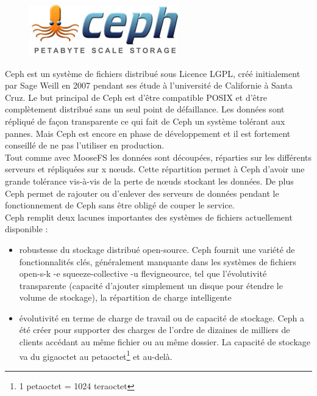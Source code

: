 \documentclass[12pt]{report}
\begin{document}
                        \begin{figure}[H]
				\begin{center}
					\includegraphics[width=0.40\linewidth]{images/cephfs.jpg}
				\end{center}
			\end{figure}

                        Ceph est un système de fichiers distribué sous Licence LGPL, créé initialement par Sage Weill en 2007 pendant ses étude à l'université de Californie à Santa Cruz. Le but principal de Ceph est d'être compatible POSIX et d'être complètement distribué sans un seul point de défaillance. Les données sont répliqué de façon transparente ce qui fait de Ceph un système tolérant aux pannes. Mais Ceph est encore en phase de développement et il est fortement conseillé de ne pas l'utiliser en production.\\

                        Tout comme avec MooseFS les données sont découpées, réparties sur les différents serveurs et répliquées sur x nœuds. Cette répartition permet à Ceph d'avoir une grande tolérance vis-à-vis de la perte de nœuds stockant les données. De plus Ceph permet de rajouter ou d'enlever des serveurs de données pendant le fonctionnement de Ceph sans être obligé de couper le service.\\

                        Ceph remplit deux lacunes importantes des systèmes de fichiers actuellement disponible :
                        \begin{itemize}
                          \item robustesse du stockage distribué open-source. Ceph fournit une variété de fonctionnalités clés, généralement manquante dans les systèmes de fichiers open-s-k -e squeeze-collective -u flevigneource, tel que l'évolutivité transparente (capacité d'ajouter simplement un disque pour étendre le volume de stockage), la répartition de charge intelligente
                          \item évolutivité en terme de charge de travail ou de capacité de stockage. Ceph a été créer pour supporter des charges de l'ordre de dizaines de milliers de clients accédant au même fichier ou au même dossier. La capacité de stockage va du gigaoctet au petaoctet\footnote{1 petaoctet = 1024 teraoctet} et au-delà.
                        \end{itemize}
\newpage
                        
\end{document}
